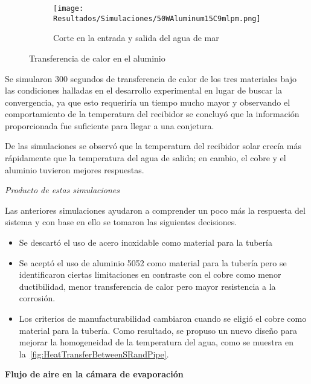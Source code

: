 				\begin{figure}[H]\ContinuedFloat
					\begin{subfigure}[t]{\linewidth}
						\centering
						\texttt{[image: Resultados/Simulaciones/50WAluminum15C9mlpm.png]}
						\caption{Corte en la entrada y salida del agua de mar}
						\label{fig:50WAluminum15C9mlpm}
					\end{subfigure}
					\hfill
					\caption{Transferencia de calor en el aluminio}
					\label{fig:aluminum-heat-transfer}
				\end{figure}
				
				Se simularon 300 segundos de transferencia de calor de los tres materiales bajo las condiciones halladas en el desarrollo experimental en lugar de buscar la convergencia, ya que esto requeriría un tiempo mucho mayor y observando el comportamiento de la temperatura del recibidor se concluyó que la información proporcionada fue suficiente para llegar a una conjetura.
				
				De las simulaciones se observó que la temperatura del recibidor solar crecía más rápidamente que la temperatura del agua de salida; en cambio, el cobre y el aluminio tuvieron mejores respuestas.
				
				\textit{Producto de estas simulaciones}
				
				Las anteriores simulaciones ayudaron a comprender un poco más la respuesta del sistema y con base en ello se tomaron las siguientes decisiones.
				
				\begin{itemize}
					\item Se descartó el uso de acero inoxidable como material para la tubería
					\item Se aceptó el uso de aluminio 5052 como material para la tubería pero se identificaron ciertas limitaciones en contraste con el cobre como menor ductibilidad, menor transferencia de calor pero mayor resistencia a la corrosión.
					\item Los criterios de manufacturabilidad cambiaron cuando se eligió el cobre como material para la tubería. Como resultado, se propuso un nuevo diseño para mejorar la homogeneidad de la temperatura del agua, como se muestra en la~\cref{fig:HeatTransferBetweenSRandPipe}.
				\end{itemize}
				
				
				\textbf{Flujo de aire en la cámara de evaporación}\par
			
